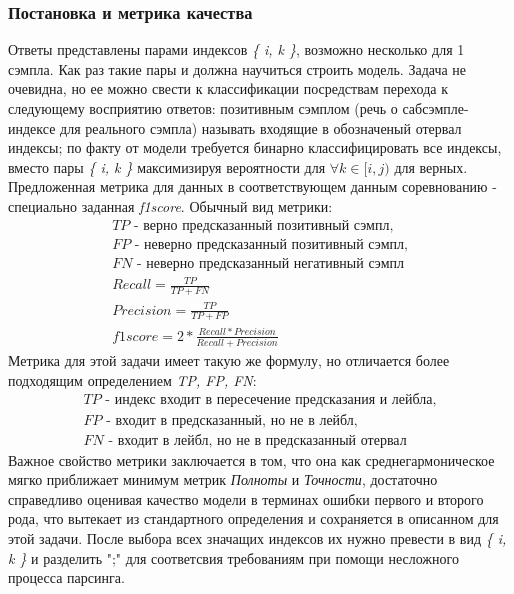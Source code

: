 \subsubsection{Постановка и метрика качества}
Ответы представлены парами индексов \textit{\{ i, k \}}, возможно несколько для 1 сэмпла. Как раз такие пары и должна научиться строить модель.
Задача не очевидна, но ее можно свести к классификации посредствам перехода к следующему восприятию ответов:
позитивным сэмплом (речь о сабсэмпле-индексе для реального сэмпла) называть входящие в обозначеный отервал индексы; по факту от модели требуется бинарно классифицировать все индексы, вместо пары \textit{\{ i, k \}} максимизируя вероятности для $\forall k \in [i,j)$ для верных.
\newline
Предложенная метрика для данных в соответствующем данным соревнованию - специально заданная \textit{f1score}. Обычный вид метрики:
\begin{gather*}
    \textit{TP - верно предсказанный позитивный сэмпл,}\\ 
    \textit{FP - неверно предсказанный позитивный сэмпл,}\\
    \textit{FN - неверно предсказанный негативный сэмпл}\\
    \nonumber Recall = \frac{TP}{TP+FN}\\
    \nonumber Precision = \frac{TP}{TP+FP}\\
    f1score = 2*\frac{Recall*Precision}{Recall+Precision}
\end{gather*}
Метрика для этой задачи имеет такую же формулу, но отличается более подходящим определением \textit{TP, FP, FN}:
\begin{gather*}
    \textit{TP - индекс входит в пересечение предсказания и лейбла,}\\
    \textit{FP - входит в предсказанный, но не в лейбл,}\\
    \textit{FN - входит в лейбл, но не в предсказанный отервал}
\end{gather*}
Важное свойство метрики заключается в том, что она как среднегармоническое мягко приближает минимум метрик \textit{Полноты} и \textit{Точности}, достаточно справедливо оценивая качество модели в терминах ошибки первого и второго рода, что вытекает из стандартного определения и сохраняется в описанном для этой задачи. 
\newline
После выбора всех значащих индексов их нужно превести в вид \textit{\{ i, k \}} и разделить ";" для соответсвия требованиям при помощи несложного процесса парсинга.
